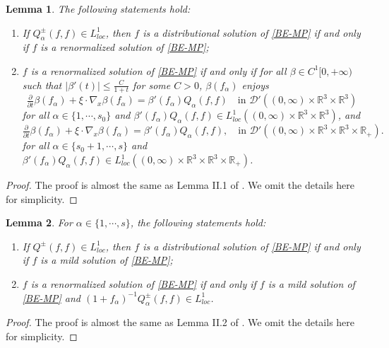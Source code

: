 \documentclass[reqno,11pt]{amsart}
\newtheorem{lemma}{Lemma}[section]
\numberwithin{equation}{section}
\def\R{\mathbb{R}}
\begin{document}
\begin{lemma}\label{Lemma 3.1}
The following statements hold:
	\begin{enumerate}
		\item {If $Q^\pm_\alpha(f,f) \in L^1_{loc} $, then $f$ is a distributional solution of \eqref{BE-MP} if and only if $f$ is a renormalized solution of \eqref{BE-MP}; }

		\item {$f$ is a renormalized solution of \eqref{BE-MP} if and only if for all $\beta \in C^1[0,+\infty)$ such that $|\beta '(t)|\leq \frac{C}{1+t}$ for some $C > 0$, $\beta(f_\alpha)$ enjoys
		\begin{equation*}
		\tfrac{\partial }{\partial t }\beta (f_\alpha) + \xi \cdot \nabla_x \beta (f_\alpha)= \beta'(f_\alpha) Q_\alpha(f,f) \quad \text{in } \mathscr{D}'((0,\infty)\times \R^3 \times \R^3) 
		\end{equation*}	
for all $\alpha \in \{1,\cdots,s_0\}$ and $\beta'(f_\alpha) Q_\alpha(f,f) \in L^1_{loc} ((0, \infty) \times \R^3 \times \R^3) $, and 
		\begin{equation*}
			\tfrac{\partial }{\partial t }\beta (f_\alpha) + \xi \cdot \nabla_x \beta (f_\alpha)= \beta'(f_\alpha) Q_\alpha(f,f),\quad \text{in } \mathscr{D}'((0,\infty)\times \R^3 \times \R^3\times \R_+).
		\end{equation*}		
for all $\alpha \in \{s_0+1,\cdots,s\}$ and $\beta'(f_\alpha) Q_\alpha(f,f) \in L^1_{loc} ((0, \infty) \times \R^3 \times \R^3 \times \R_+)$.}
	\end{enumerate}
\end{lemma}

\begin{proof}
The proof is almost the same as Lemma II.1 of \cite{Diperna-Lions}. We omit the details here for simplicity.
\end{proof}

    \begin{lemma}\label{distri-mild}
    For $\alpha \in \{ 1, \cdots, s \}$, the following statements hold:
	\begin{enumerate}
		\item {If $Q^\pm(f,f) \in L^1_{loc}$, then $f$ is a distributional solution of \eqref{BE-MP} if and only if $f$ is a mild solution of \eqref{BE-MP}; }
		\item {$f$ is a renormalized solution of \eqref{BE-MP} if and only if $f$ is a mild solution of \eqref{BE-MP} and $(1+f_\alpha )^{-1} Q^\pm_\alpha(f,f) \in L^1_{loc}$. }
	\end{enumerate}
\end{lemma}
\begin{proof}

The proof is almost the same as Lemma II.2 of \cite{Diperna-Lions}. We omit the details here for simplicity.
\end{proof}
\end{document}

